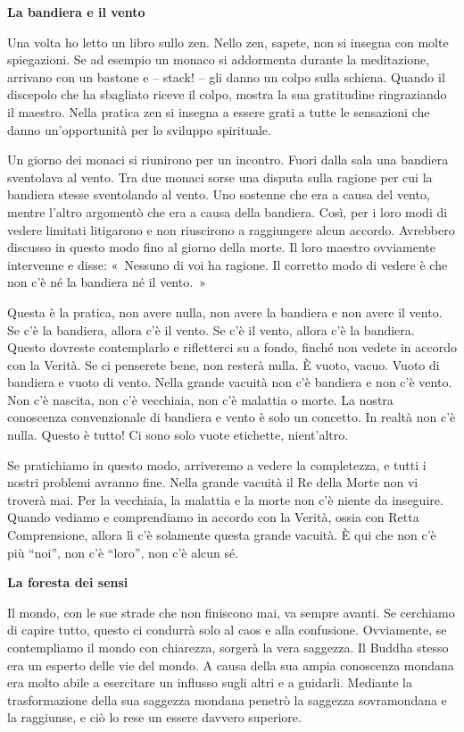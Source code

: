 \textbf{La bandiera e il vento}

Una volta ho letto un libro sullo zen. Nello zen, sapete, non si insegna
con molte spiegazioni. Se ad esempio un monaco si addormenta durante la
meditazione, arrivano con un bastone e -- stack! -- gli danno un colpo
sulla schiena. Quando il discepolo che ha sbagliato riceve il colpo,
mostra la sua gratitudine ringraziando il maestro. Nella pratica zen si
insegna a essere grati a tutte le sensazioni che danno un'opportunità
per lo sviluppo spirituale.

Un giorno dei monaci si riunirono per un incontro. Fuori dalla sala una
bandiera sventolava al vento. Tra due monaci sorse una disputa sulla
ragione per cui la bandiera stesse sventolando al vento. Uno sostenne
che era a causa del vento, mentre l'altro argomentò che era a causa
della bandiera. Così, per i loro modi di vedere limitati litigarono e
non riuscirono a raggiungere alcun accordo. Avrebbero discusso in questo
modo fino al giorno della morte. Il loro maestro ovviamente intervenne e
disse: «~Nessuno di voi ha ragione. Il corretto modo di vedere è che non
c'è né la bandiera né il vento.~»

Questa è la pratica, non avere nulla, non avere la bandiera e non avere
il vento. Se c'è la bandiera, allora c'è il vento. Se c'è il vento,
allora c'è la bandiera. Questo dovreste contemplarlo e rifletterci su a
fondo, finché non vedete in accordo con la Verità. Se ci penserete bene,
non resterà nulla. È vuoto, vacuo. Vuoto di bandiera e vuoto di vento.
Nella grande vacuità non c'è bandiera e non c'è vento. Non c'è nascita,
non c'è vecchiaia, non c'è malattia o morte. La nostra conoscenza
convenzionale di bandiera e vento è solo un concetto. In realtà non c'è
nulla. Questo è tutto! Ci sono solo vuote etichette, nient'altro.

Se pratichiamo in questo modo, arriveremo a vedere la completezza, e
tutti i nostri problemi avranno fine. Nella grande vacuità il Re della
Morte non vi troverà mai. Per la vecchiaia, la malattia e la morte non
c'è niente da inseguire. Quando vediamo e comprendiamo in accordo con la
Verità, ossia con Retta Comprensione, allora lì c'è solamente questa
grande vacuità. È qui che non c'è più ``noi'', non c'è ``loro'', non c'è
alcun sé.

\textbf{La foresta dei sensi}

Il mondo, con le sue strade che non finiscono mai, va sempre avanti. Se
cerchiamo di capire tutto, questo ci condurrà solo al caos e alla
confusione. Ovviamente, se contempliamo il mondo con chiarezza, sorgerà
la vera saggezza. Il Buddha stesso era un esperto delle vie del mondo. A
causa della sua ampia conoscenza mondana era molto abile a esercitare un
influsso sugli altri e a guidarli. Mediante la trasformazione della sua
saggezza mondana penetrò la saggezza sovramondana e la raggiunse, e ciò
lo rese un essere davvero superiore.

